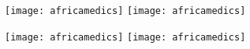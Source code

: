 \documentclass{book}
\makeatletter
\newcommand{\cleartoevenpage}{%
  \clearpage%
  \ifoddpage\c@page\hbox{}\clearpage\fi}
\makeatother
\begin{document}


\cleartoevenpage
\texttt{[image: africamedics]}
\newpage
\hspace*{-\textwidth}\texttt{[image: africamedics]}\hspace{1em}
\parbox[b]{0.3\textwidth}{\lipsum*[1-2]}


\cleartoevenpage
\texttt{[image: africamedics]}
\newpage
\hspace*{-\textwidth}\texttt{[image: africamedics]}\hspace{1em}
\parbox[b]{0.3\textwidth}{\lipsum*[1-2]}
\end{document}
